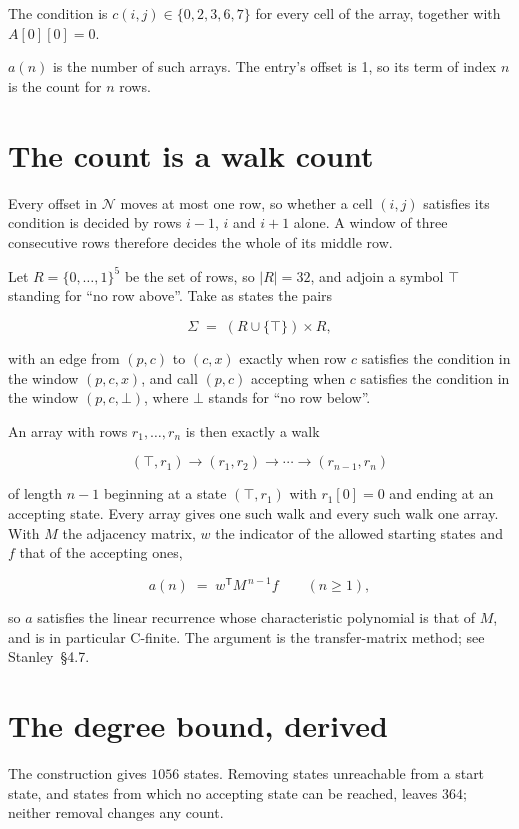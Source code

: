 \documentclass[11pt]{article}
\theoremstyle{definition}
\begin{document}
The condition is $c(i,j) \in \{0, 2, 3, 6, 7\}$ for every cell of the array, together with $A[0][0]=0$.

$a(n)$ is the number of such arrays. The entry's offset is 1, so its term of index $n$ is the count for $n$ rows.

\section{The count is a walk count}

Every offset in $\mathcal{N}$ moves at most one row, so whether a cell $(i,j)$ satisfies its condition is decided by rows $i-1$, $i$ and $i+1$ alone. A window of three consecutive rows therefore decides the whole of its middle row.

Let $R = \{0,\dots,1\}^{5}$ be the set of rows, so $|R| = 32$, and adjoin a symbol $\top$ standing for ``no row above''. Take as states the pairs

\[\Sigma \;=\; (R \cup \{\top\}) \times R,\]

with an edge from $(p,c)$ to $(c,x)$ exactly when row $c$ satisfies the condition in the window $(p,c,x)$, and call $(p,c)$ accepting when $c$ satisfies the condition in the window $(p,c,\bot)$, where $\bot$ stands for ``no row below''.

An array with rows $r_1,\dots,r_n$ is then exactly a walk

\[(\top,r_1) \to (r_1,r_2) \to \cdots \to (r_{n-1},r_n)\]

of length $n-1$ beginning at a state $(\top,r_1)$ with $r_1[0]=0$ and ending at an accepting state. Every array gives one such walk and every such walk one array. With $M$ the adjacency matrix, $w$ the indicator of the allowed starting states and $f$ that of the accepting ones,

\[a(n) \;=\; w^{\mathsf T} M^{\,n-1} f \qquad (n \ge 1),\]

so $a$ satisfies the linear recurrence whose characteristic polynomial is that of $M$, and is in particular C-finite. The argument is the transfer-matrix method; see Stanley~\S4.7.

\section{The degree bound, derived}

The construction gives $1056$ states. Removing states unreachable from a start state, and states from which no accepting state can be reached, leaves $364$; neither removal changes any count.
\end{document}
